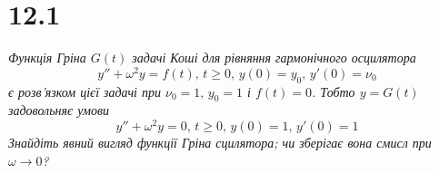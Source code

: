 


%


\section[Задача №12.1]{12.1}

\textit{Функція Гріна $G(t)$ задачі Коші для рівняння гармонічного осцилятора \[y'' + \omega^2y = f(t), \, t \geq 0, \, y(0)=y_0, \, y'(0)=\nu_0\] є розв’язком цієї задачі при $\nu_0 = 1 , \, y_0 = 1$ і $f(t) = 0$. Тобто $y = G(t)$ задовольняє умови \[y'' + \omega^2y = 0, \, t \geq 0, \, y(0)=1, \, y'(0)=1\] Знайдіть явний вигляд функції Гріна сцилятора; чи зберігає вона смисл при $\omega \to 0$?}


%